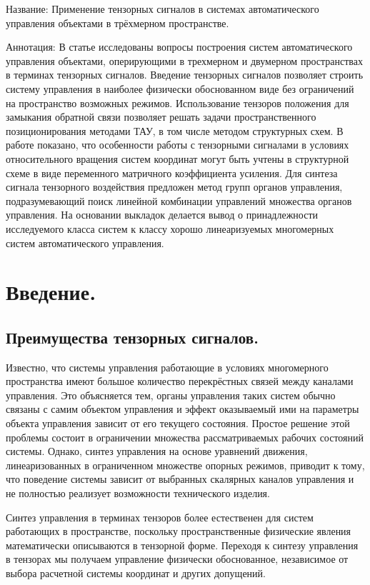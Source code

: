 \documentclass[a4paper]{article}
\begin{document}
Название:
Применение тензорных сигналов в системах автоматического управления объектами в трёхмерном пространстве.

Аннотация:
В статье исследованы вопросы построения систем автоматического управления объектами, оперирующими в трехмерном и двумерном пространствах в терминах тензорных сигналов. Введение тензорных сигналов позволяет строить систему управления в наиболее физически обоснованном виде без ограничений на пространство возможных режимов. Использование тензоров положения для замыкания обратной связи позволяет решать задачи пространственного позиционирования методами ТАУ, в том числе методом структурных схем. В работе показано, что особенности работы с тензорными сигналами в условиях относительного вращения систем координат могут быть учтены в структурной схеме в виде переменного матричного коэффициента усиления. Для синтеза сигнала тензорного воздействия предложен метод групп органов управления, подразумевающий поиск линейной комбинации управлений множества органов управления. На основании выкладок делается вывод о принадлежности исследуемого класса систем к классу хорошо линеаризуемых многомерных систем автоматического управления.

\section{Введение.}
\subsection{Преимущества тензорных сигналов.}

Известно, что системы управления работающие в условиях многомерного пространства имеют большое количество перекрёстных связей между каналами управления. Это объясняется тем, органы управления таких систем обычно связаны с самим объектом управления и эффект оказываемый ими на параметры объекта управления зависит от его текущего состояния. Простое решение этой проблемы состоит в ограничении множества рассматриваемых рабочих состояний системы. Однако, синтез управления на основе уравнений движения, линеаризованных в ограниченном множестве опорных режимов, приводит к тому, что поведение системы зависит от выбранных скалярных каналов управления и не полностью реализует возможности технического изделия.

Синтез управления в терминах тензоров более естественен для систем работающих в пространстве, поскольку пространственные физические явления математически описываются в тензорной форме. Переходя к синтезу управления в тензорах мы получаем управление физически обоснованное, независимое от выбора расчетной системы координат и других допущений. 
\end{document}
